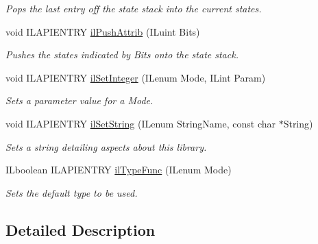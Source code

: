 \begin{DoxyCompactItemize}
\begin{DoxyCompactList}\small\item\em Pops the last entry off the state stack into the current states. \end{DoxyCompactList}\item 
void I\+L\+A\+P\+I\+E\+N\+T\+R\+Y \hyperlink{group__state_ga72e0879c71f59f06c35d2e2a10191fa8}{il\+Push\+Attrib} (I\+Luint Bits)
\begin{DoxyCompactList}\small\item\em Pushes the states indicated by Bits onto the state stack. \end{DoxyCompactList}\item 
void I\+L\+A\+P\+I\+E\+N\+T\+R\+Y \hyperlink{group__state_ga74a39ec8faa5aa005e918a7049985ef6}{il\+Set\+Integer} (I\+Lenum Mode, I\+Lint Param)
\begin{DoxyCompactList}\small\item\em Sets a parameter value for a {\itshape Mode}. \end{DoxyCompactList}\item 
void I\+L\+A\+P\+I\+E\+N\+T\+R\+Y \hyperlink{group__state_ga9a4eb898282d4a5cdecc6303bca20814}{il\+Set\+String} (I\+Lenum String\+Name, const char $\ast$String)
\begin{DoxyCompactList}\small\item\em Sets a string detailing aspects about this library. \end{DoxyCompactList}\item 
\hypertarget{group__state_ga7ab67de503e1fad00d984167aee02fa9}{I\+Lboolean I\+L\+A\+P\+I\+E\+N\+T\+R\+Y \hyperlink{group__state_ga7ab67de503e1fad00d984167aee02fa9}{il\+Type\+Func} (I\+Lenum Mode)}\label{group__state_ga7ab67de503e1fad00d984167aee02fa9}

\begin{DoxyCompactList}\small\item\em Sets the default type to be used. \end{DoxyCompactList}\end{DoxyCompactItemize}


\subsection{Detailed Description}


